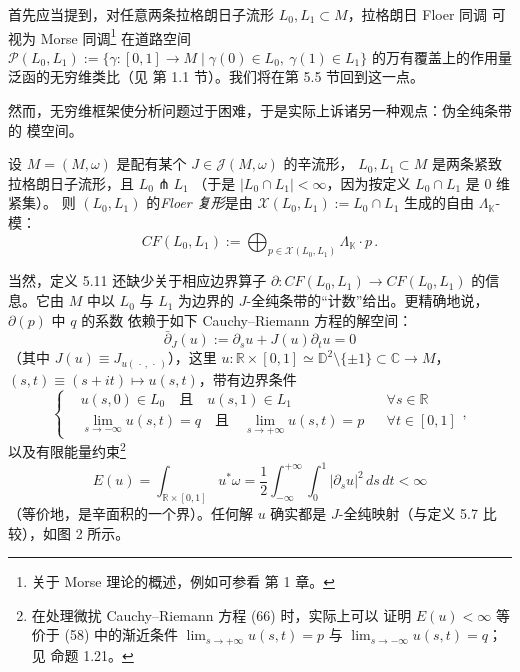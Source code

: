 首先应当提到，对任意两条拉格朗日子流形 $L_0,L_1\subset M$，拉格朗日 Floer 同调
可视为 Morse 同调\footnote{关于 Morse 理论的概述，例如可参看 \cite{Mer14} 第 1 章。}
在道路空间 $\mathcal P(L_0,L_1):=\{\gamma:[0,1]\to M\mid\gamma(0)\in L_0,\
\gamma(1)\in L_1\}$ 的万有覆盖上的作用量泛函的无穷维类比（见 \cite{Aur13}
第 1.1 节）。我们将在第 5.5 节回到这一点。

然而，无穷维框架使分析问题过于困难，于是实际上诉诸另一种观点：伪全纯条带的
模空间。

\begin{Def}\label{def:5.11}
设 $M=(M,\omega)$ 是配有某个 $J\in\mathcal J(M,\omega)$ 的辛流形，
$L_0,L_1\subset M$ 是两条紧致拉格朗日子流形，且 $L_0\pitchfork L_1$
（于是 $|L_0\cap L_1|<\infty$，因为按定义 $L_0\cap L_1$ 是 $0$ 维紧集）。
则 $(L_0,L_1)$ 的\emph{Floer 复形}是由 $\mathcal X(L_0,L_1):=L_0\cap L_1$
生成的自由 $\Lambda_{\mathbb K}$-模：
\begin{equation}
CF(L_0,L_1):=\bigoplus_{p\in\mathcal X(L_0,L_1)}\Lambda_{\mathbb K}\cdot p\,.
\label{eq:5.56}
\end{equation}
\end{Def}

当然，定义 5.11 还缺少关于相应边界算子
$\partial:CF(L_0,L_1)\to CF(L_0,L_1)$ 的信息。它由 $M$ 中以 $L_0$ 与 $L_1$
为边界的 $J$-全纯条带的“计数”给出。更精确地说，$\partial(p)$ 中 $q$ 的系数
依赖于如下 Cauchy--Riemann 方程的解空间：
\begin{equation}
\bar\partial_J(u):=\partial_su+J(u)\partial_tu=0
\label{eq:5.57}
\end{equation}
（其中 $J(u)\equiv J_{u(\,\cdot\,,\,\cdot\,)}$），这里
$u:\mathbb R\times[0,1]\simeq\mathbb D^2\setminus\{\pm1\}\subset\mathbb C\to M$，
$(s,t)\equiv(s+it)\mapsto u(s,t)$，带有边界条件
\begin{equation}
\left\{
\begin{aligned}
&u(s,0)\in L_0\quad\text{且}\quad u(s,1)\in L_1 &&\forall s\in\mathbb R\\
&\lim_{s\to-\infty}u(s,t)=q\quad\text{且}\quad
\lim_{s\to+\infty}u(s,t)=p &&\forall t\in[0,1]
\end{aligned}
\right.,
\label{eq:5.58}
\end{equation}
以及有限能量约束\footnote{在处理微扰 Cauchy--Riemann 方程 (66) 时，实际上可以
证明 $E(u)<\infty$ 等价于 (58) 中的渐近条件
$\lim_{s\to+\infty}u(s,t)=p$ 与 $\lim_{s\to-\infty}u(s,t)=q$；见 \cite{Sal97}
命题 1.21。}
\begin{equation}
E(u)=\int_{\mathbb R\times[0,1]}u^*\omega
=\frac12\int_{-\infty}^{+\infty}\!\!\int_0^1|\partial_su|^2\,ds\,dt<\infty
\label{eq:5.59}
\end{equation}
（等价地，是辛面积的一个界）。任何解 $u$ 确实都是 $J$-全纯映射（与定义 5.7
比较），如图 2 所示。

